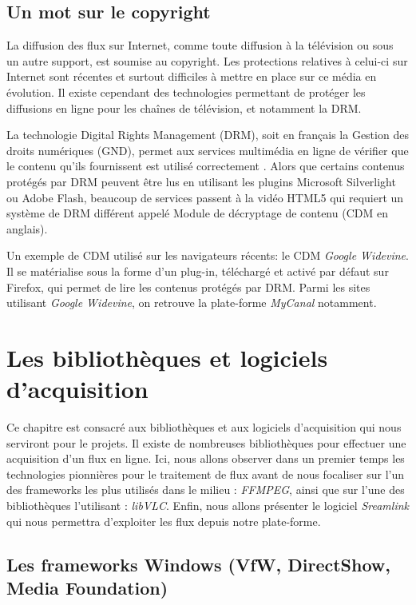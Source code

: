 \documentclass{polytech/polytech}
\begin{document}
\section{Un mot sur le copyright}
\label{sec:copyright}

La diffusion des flux sur Internet, comme toute diffusion à la télévision ou sous un autre support, est soumise au copyright. Les protections relatives à celui-ci sur Internet sont récentes et surtout difficiles à mettre en place sur ce média en évolution. Il existe cependant des technologies permettant de protéger les diffusions en ligne pour les chaînes de télévision, et notamment la DRM.

La technologie Digital Rights Management (DRM), soit en français la Gestion des droits numériques (GND), permet aux services multimédia en ligne de vérifier que le contenu qu'ils fournissent est utilisé correctement \cite{_lire_2018}. Alors que certains contenus protégés par DRM peuvent être lus en utilisant les plugins Microsoft Silverlight ou Adobe Flash, beaucoup de services passent à la vidéo HTML5 qui requiert un système de DRM différent appelé Module de décryptage de contenu (CDM en anglais).

Un exemple de CDM utilisé sur les navigateurs récents: le CDM \textit{Google Widevine}. Il se matérialise sous la forme d'un plug-in, téléchargé et activé par défaut sur Firefox, qui permet de lire les contenus protégés par DRM. Parmi les sites utilisant \textit{Google Widevine}, on retrouve la plate-forme \textit{MyCanal} notamment.


\chapter{Les bibliothèques et logiciels d'acquisition}


Ce chapitre est consacré aux bibliothèques et aux logiciels d'acquisition qui nous serviront pour le projets. Il existe de nombreuses bibliothèques pour effectuer une acquisition d'un flux en ligne. Ici, nous allons observer dans un premier temps les technologies pionnières pour le traitement de flux avant de nous focaliser sur l'un des frameworks les plus utilisés dans le milieu : \textit{FFMPEG}, ainsi que sur l'une des bibliothèques l'utilisant : \textit{libVLC}. Enfin, nous allons présenter le logiciel \textit{Sreamlink} qui nous permettra d'exploiter les flux depuis notre plate-forme.


\section{Les frameworks Windows (VfW, DirectShow, Media Foundation)}
\end{document}
